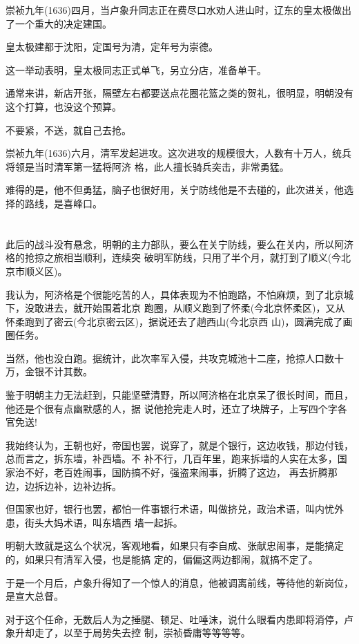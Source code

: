 \documentclass[11pt,a4paper,onecolumn]{article}
\begin{document}
崇祯九年(1636)四月，当卢象升同志正在费尽口水劝人进山时，辽东的皇太极做出了一个重大的决定\myrule 建国。

皇太极建都于沈阳，定国号为清，定年号为崇德。

这一举动表明，皇太极同志正式单飞，另立分店，准备单干。

通常来讲，新店开张，隔壁左右都要送点花圈花篮之类的贺礼，很明显，明朝没有这个打算，也没这个预算。

不要紧，不送，就自己去抢。

崇祯九年(1636)六月，清军发起进攻。这次进攻的规模很大，人数有十万人，统兵将领是当时清军第一猛将阿济
格，此人擅长骑兵突击，非常勇猛。

难得的是，他不但勇猛，脑子也很好用，关宁防线他是不去碰的，此次进关，他选择的路线，是喜峰口。

\section[\thesection]{}

此后的战斗没有悬念，明朝的主力部队，要么在关宁防线，要么在关内，所以阿济格的抢掠之旅相当顺利，连续突
破明军防线，只用了半个月，就打到了顺义(今北京市顺义区)。

我认为，阿济格是个很能吃苦的人，具体表现为不怕跑路，不怕麻烦，到了北京城下，没敢进去，就开始围着北京
跑圈，从顺义跑到了怀柔(今北京怀柔区)，又从怀柔跑到了密云(今北京密云区)，据说还去了趟西山(今北京西
山)，圆满完成了画圈任务。

当然，他也没白跑。据统计，此次率军入侵，共攻克城池十二座，抢掠人口数十万，金银不计其数。

鉴于明朝主力无法赶到，只能坚壁清野，所以阿济格在北京呆了很长时间，而且，他还是个很有点幽默感的人，据
说他抢完走人时，还立了块牌子，上写四个字\myrule 各官免送!

我始终认为，王朝也好，帝国也罢，说穿了，就是个银行，这边收钱，那边付钱，总而言之，拆东墙，补西墙。不
补不行，几百年里，跑来拆墙的人实在太多，国家治不好，老百姓闹事，国防搞不好，强盗来闹事，折腾了这边，
再去折腾那边，边拆边补，边补边拆。

但国家也好，银行也罢，都怕一件事\myrule 银行术语，叫做挤兑，政治术语，叫内忧外患，街头大妈术语，叫东墙西
墙一起拆。

明朝大致就是这么个状况，客观地看，如果只有李自成、张献忠闹事，是能搞定的，如果只有清军入侵，也是能搞
定的，偏偏这两边都闹，就搞不定了。

于是一个月后，卢象升得知了一个惊人的消息，他被调离前线，等待他的新岗位，是宣大总督。

对于这个任命，无数后人为之捶腿、顿足、吐唾沫，说什么眼看内患即将消停，卢象升却走了，以至于局势失去控
制，崇祯昏庸等等等等。
\end{document}
